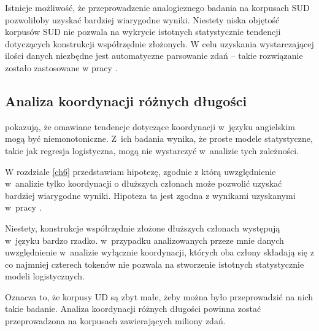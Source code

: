 Istnieje możliwość, że przeprowadzenie analogicznego badania na korpusach SUD pozwoliłoby uzyskać bardziej wiarygodne wyniki. Niestety niska objętość korpusów SUD nie pozwala na wykrycie istotnych statystycznie tendencji dotyczących konstrukcji współrzędnie złożonych. W celu uzyskania wystarczającej ilości danych niezbędne jest automatyczne parsowanie zdań -- takie rozwiązanie zostało zastosowane w pracy \cite{borysiak2024dependency}.


\subsection{Analiza koordynacji różnych długości}

\cite{przepiorkowski2024argument} pokazują, że omawiane tendencje dotyczące koordynacji w~języku angielskim mogą być niemonotoniczne. Z~ich badania wynika, że proste modele statystyczne, takie jak regresja logistyczna, mogą nie wystarczyć w~analizie tych zależności.

W rozdziale \ref{ch6} przedstawiam hipotezę, zgodnie z którą uwzględnienie w~analizie tylko koordynacji o dłuższych członach może pozwolić uzyskać bardziej wiarygodne wyniki. Hipoteza ta jest zgodna z wynikami uzyskanymi w~pracy \cite{przepiorkowski2024argument}. 

Niestety, konstrukcje współrzędnie złożone dłuższych członach występują w~języku bardzo rzadko. w~przypadku analizowanych przeze mnie danych uwzględnienie w~analizie wyłącznie koordynacji, których oba człony składają się z co najmniej czterech tokenów nie pozwala na stworzenie istotnych statystycznie modeli logistycznych.

Oznacza to, że korpusy UD są zbyt małe, żeby można było przeprowadzić na nich takie badanie. Analiza koordynacji różnych długości powinna zostać przeprowadzona na korpusach zawierających miliony zdań.